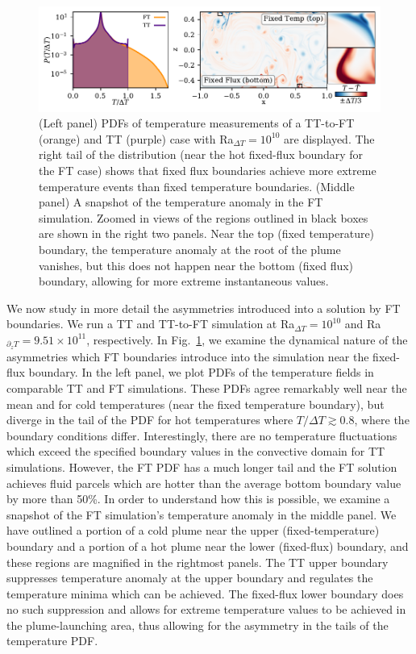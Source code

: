 \begin{figure}
\includegraphics[width=\textwidth]{./figs/rbc_dynamics_asymmetries.pdf}
\caption[PDF and snapshot examination of asymmetries in FT simulations]{ 
	(Left panel) PDFs of temperature measurements of a TT-to-FT (orange) and TT (purple) case with Ra$_{\Delta T} = 10^{10}$ are displayed.
	The right tail of the distribution (near the hot fixed-flux boundary for the FT case) shows that fixed flux boundaries achieve more extreme temperature events than fixed temperature boundaries.
	(Middle panel) A snapshot of the temperature anomaly in the FT simulation.
	Zoomed in views of the regions outlined in black boxes are shown in the right two panels.
	Near the top (fixed temperature) boundary, the temperature anomaly at the root of the plume vanishes, but this does not happen near the bottom (fixed flux) boundary, allowing for more extreme instantaneous values.
\label{fig:rbc_dynamics_asymmetries} }
\end{figure}

We now study in more detail the asymmetries introduced into a solution by FT boundaries.
We run a TT and TT-to-FT simulation at Ra$_{\Delta T} = 10^{10}$ and Ra$_{\partial_z T} = 9.51 \times 10^{11}$, respectively.
In Fig.~\ref{fig:rbc_dynamics_asymmetries}, we examine the dynamical nature of the asymmetries which FT boundaries introduce into the simulation near the fixed-flux boundary.
In the left panel, we plot PDFs of the temperature fields in comparable TT and FT simulations.
These PDFs agree remarkably well near the mean and for cold temperatures (near the fixed temperature boundary), but diverge in the tail of the PDF for hot temperatures where $T/\Delta T \gtrsim 0.8$, where the boundary conditions differ.
Interestingly, there are no temperature fluctuations which exceed the specified boundary values in the convective domain for TT simulations.
However, the FT PDF has a much longer tail and the FT solution achieves fluid parcels which are hotter than the average bottom boundary value by more than 50\%.
In order to understand how this is possible, we examine a snapshot of the FT simulation's temperature anomaly in the middle panel.
We have outlined a portion of a cold plume near the upper (fixed-temperature) boundary and a portion of a hot plume near the lower (fixed-flux) boundary, and these regions are magnified in the rightmost panels.
The TT upper boundary suppresses temperature anomaly at the upper boundary and regulates the temperature minima which can be achieved.
The fixed-flux lower boundary does no such suppression and allows for extreme temperature values to be achieved in the plume-launching area, thus allowing for the asymmetry in the tails of the temperature PDF.


